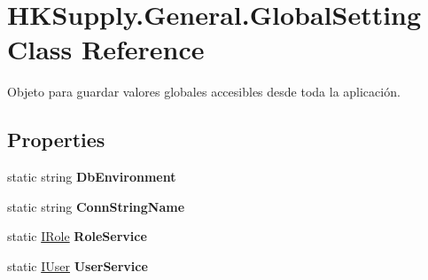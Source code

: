 \hypertarget{class_h_k_supply_1_1_general_1_1_global_setting}{}\section{H\+K\+Supply.\+General.\+Global\+Setting Class Reference}
\label{class_h_k_supply_1_1_general_1_1_global_setting}


Objeto para guardar valores globales accesibles desde toda la aplicación.  


\subsection*{Properties}
\begin{DoxyCompactItemize}
\item 
\mbox{\label{class_h_k_supply_1_1_general_1_1_global_setting_acfdc9e23af69b45b356f006e1c1fd999}} 
static string {\bfseries Db\+Environment}
\item 
\mbox{\label{class_h_k_supply_1_1_general_1_1_global_setting_ae2572ea262822ef066e0491aae6794da}} 
static string {\bfseries Conn\+String\+Name}
\item 
\mbox{\label{class_h_k_supply_1_1_general_1_1_global_setting_a6bfb54fe6ce82b0427c93287f3174fcc}} 
static \mbox{\hyperlink{interface_h_k_supply_1_1_services_1_1_interfaces_1_1_i_role}{I\+Role}} {\bfseries Role\+Service}
\item 
\mbox{\label{class_h_k_supply_1_1_general_1_1_global_setting_afcf3f82e4605ee135bef3b76601faef8}} 
static \mbox{\hyperlink{interface_h_k_supply_1_1_services_1_1_interfaces_1_1_i_user}{I\+User}} {\bfseries User\+Service}
\item 
\mbox{\label{class_h_k_supply_1_1_general_1_1_global_setting_aa4423c9bf929f499c03e32ebee39d7bc}} 

\end{DoxyCompactItemize}
